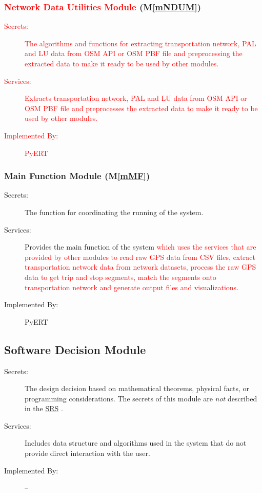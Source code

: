 \documentclass[12pt, titlepage]{article}
\newcommand{\mref}[1]{M\ref{#1}}
\begin{document}
\subsubsection{\textcolor{red}{Network Data Utilities Module} (\mref{mNDUM})}

\begin{description}
\item[\textcolor{red}{Secrets:}] \textcolor{red}{The algorithms and functions for extracting transportation network, PAL and LU data from OSM API or OSM PBF file and preprocessing the extracted data to make it ready to be used by other modules.}
\item[\textcolor{red}{Services:}] \textcolor{red}{Extracts transportation network, PAL and LU data from OSM API or OSM PBF file and preprocesses the extracted data to make it ready to be used by other modules.}
\item[\textcolor{red}{Implemented By:}] \textcolor{red}{PyERT}
\end{description}

\subsubsection{Main Function Module (\mref{mMF})}

\begin{description}
\item[Secrets:] The function for coordinating the running of the system.
\item[Services:] Provides the main function of the system \textcolor{red}{which uses the services that are provided by other modules to read raw GPS data from CSV files, extract transportation network data from network datasets, process the raw GPS data to get trip and stop segments, match the segments onto transportation network and generate output files and visualizations}.
\item[Implemented By:] PyERT
\end{description}


\subsection{Software Decision Module}

\begin{description}
\item[Secrets:] The design decision based on mathematical theorems, physical
  facts, or programming considerations. The secrets of this module are
  \emph{not} described in the \href{https://github.com/paezha/PyERT-BLACK/blob/main/docs/SRS/SRS.pdf}{SRS} \citep{SRS}.
\item[Services:] Includes data structure and algorithms used in the system that
  do not provide direct interaction with the user. 
\item[Implemented By:] --
\end{description}
\end{document}

